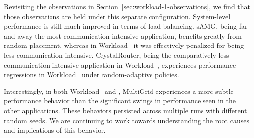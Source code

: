 
Revisiting the observations in Section~\ref{sec:workload-1-observations}, we
find that those observations are held under this separate configuration.
System-level performance is still much improved in terms of load-balancing.
sAMG, being far and away the most communication-intensive application, benefits
greatly from random placement, whereas in Workload~ it was effectively
penalized for being less communication-intensive. CrystalRouter, being the
comparatively less communication-intensive application in Workload~,
experiences performance regressions in Workload~ under random-adaptive
policies.

Interestingly, in both Workload~ and , MultiGrid experiences
a more subtle performance behavior than the significant swings in performance
seen in the other applications. These behaviors persisted across multiple runs
with different random seeds. We are continuing to work towards understanding
the root causes and implications of this behavior. 
